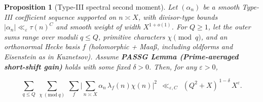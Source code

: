 \documentclass[11pt]{article}
\newtheorem{proposition}[lemma]{Proposition}
\theoremstyle{definition}
\theoremstyle{remark}
\numberwithin{equation}{part}
\begin{document}
\begin{proposition}[Type-III spectral second moment]\label{prop:typeIII}
	Let $(\alpha_n)$ be a smooth Type-III coefficient sequence supported on $n\asymp X$, with divisor-type bounds $|\alpha_n|\ll_\varepsilon \tau(n)^C$ and smooth weight of width $X^{1+o(1)}$. For $Q\ge 1$, let the outer sums range over moduli $q\le Q$, primitive characters $\chi\pmod q$, and an orthonormal Hecke basis $f$ (holomorphic + Maa\ss, including oldforms and Eisenstein as in Kuznetsov). Assume \textbf{PASSG Lemma (Prime-averaged short-shift gain)} holds with some fixed $\delta>0$. Then, for any $\varepsilon>0$,

	$$
		\sum_{q\le Q}\ \sum_{\chi\ (\mathrm{mod}\ q)}\ \sum_{f}
		\Bigg|\sum_{n\asymp X}\alpha_n\,\lambda_f(n)\chi(n)\Bigg|^2
		\ \ \ll_{\varepsilon,C}\ \ (Q^2+X)^{\,1-\delta}\,X^{\varepsilon}.
	$$

\end{proposition}
\end{document}
